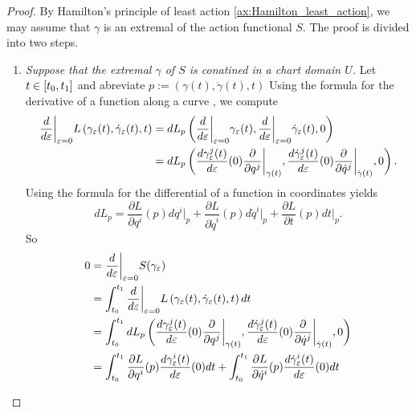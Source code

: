 \begin{proof}
	By Hamilton's principle of least action \ref{ax:Hamilton_least_action}, we may assume that $\gamma$ is an extremal of the action functional $S$. The proof is divided into two steps.
	\begin{enumerate}[label = \textit{Step \arabic*:},wide=0pt]
		\item \textit{Suppose that the extremal $\gamma$ of $S$ is conatined in a chart domain $U$.} Let $t \in \intcc[0]{t_0,t_1}$ and abreviate $p := (\gamma(t),\dot{\gamma}(t),t)$ Using the formula for the derivative of a function along a curve \cite[283]{lee:smooth_manifolds:2013}, we compute
			\begin{align*}
				\frac{d}{d\varepsilon}\bigg\vert_{\varepsilon = 0} L\del[0]{\gamma_\varepsilon(t),\dot{\gamma}_\varepsilon(t),t} &= dL_p\del[3]{\frac{d}{d\varepsilon}\bigg\vert_{\varepsilon = 0}\gamma_\varepsilon(t),\frac{d}{d\varepsilon}\bigg\vert_{\varepsilon = 0}\dot{\gamma}_\varepsilon(t),0}\\
				&= dL_p\del[3]{\frac{d\gamma_\varepsilon^j(t)}{d\varepsilon}(0)\frac{\partial}{\partial q^j}\bigg\vert_{\gamma(t)},\frac{d\dot{\gamma}_\varepsilon^j(t)}{d\varepsilon}(0)\frac{\partial}{\partial \dot{q}^j}\bigg\vert_{\dot{\gamma}(t)},0}.
			\end{align*}
			Using the formula for the differential of a function in coordinates yields
			\begin{equation*}
				dL_p = \frac{\partial L}{\partial q^i}(p) dq^i\vert_p + \frac{\partial L}{\partial \dot{q}^i}(p) d\dot{q}^i\vert_p + \frac{\partial L}{\partial t}(p)dt\vert_p.
			\end{equation*}
			So
			\begin{align*}
				0 &= \frac{d}{d\varepsilon}\bigg\vert_{\varepsilon = 0} S(\gamma_\varepsilon)\\
				&= \int_{t_0}^{t_1} \frac{d}{d\varepsilon}\bigg\vert_{\varepsilon = 0} L\del[0]{\gamma_\varepsilon(t),\dot{\gamma}_\varepsilon(t),t} dt\\
				&= \int_{t_0}^{t_1} dL_p\del[3]{\frac{d\gamma_\varepsilon^j(t)}{d\varepsilon}(0)\frac{\partial}{\partial q^j}\bigg\vert_{\gamma(t)},\frac{d\dot{\gamma}_\varepsilon^j(t)}{d\varepsilon}(0)\frac{\partial}{\partial \dot{q}^j}\bigg\vert_{\dot{\gamma}(t)},0}\\
				&= \int_{t_0}^{t_1} \frac{\partial L}{\partial q^i}(p)\frac{d\gamma_\varepsilon^i(t)}{d\varepsilon}(0)dt + \int_{t_0}^{t_1}\frac{\partial L}{\partial \dot{q}^i}(p)\frac{d\dot{\gamma}_\varepsilon^i(t)}{d\varepsilon}(0)dt\\

\end{align*}
\end{enumerate}
\end{proof}
